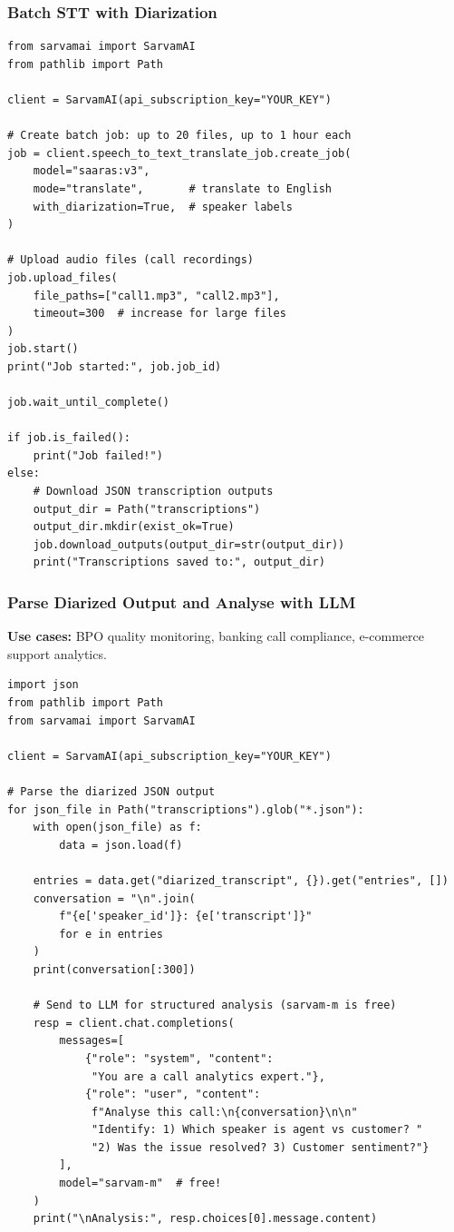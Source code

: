 \begin{frame}[fragile]\frametitle{Batch STT with Diarization}
\begin{lstlisting}
from sarvamai import SarvamAI
from pathlib import Path

client = SarvamAI(api_subscription_key="YOUR_KEY")

# Create batch job: up to 20 files, up to 1 hour each
job = client.speech_to_text_translate_job.create_job(
    model="saaras:v3",
    mode="translate",       # translate to English
    with_diarization=True,  # speaker labels
)

# Upload audio files (call recordings)
job.upload_files(
    file_paths=["call1.mp3", "call2.mp3"],
    timeout=300  # increase for large files
)
job.start()
print("Job started:", job.job_id)

job.wait_until_complete()

if job.is_failed():
    print("Job failed!")
else:
    # Download JSON transcription outputs
    output_dir = Path("transcriptions")
    output_dir.mkdir(exist_ok=True)
    job.download_outputs(output_dir=str(output_dir))
    print("Transcriptions saved to:", output_dir)
\end{lstlisting}
\end{frame}

\begin{frame}[fragile]\frametitle{Parse Diarized Output and Analyse with LLM}
\textbf{Use cases:} BPO quality monitoring, banking call compliance, e-commerce support analytics.
\begin{lstlisting}
import json
from pathlib import Path
from sarvamai import SarvamAI

client = SarvamAI(api_subscription_key="YOUR_KEY")

# Parse the diarized JSON output
for json_file in Path("transcriptions").glob("*.json"):
    with open(json_file) as f:
        data = json.load(f)

    entries = data.get("diarized_transcript", {}).get("entries", [])
    conversation = "\n".join(
        f"{e['speaker_id']}: {e['transcript']}"
        for e in entries
    )
    print(conversation[:300])

    # Send to LLM for structured analysis (sarvam-m is free)
    resp = client.chat.completions(
        messages=[
            {"role": "system", "content":
             "You are a call analytics expert."},
            {"role": "user", "content":
             f"Analyse this call:\n{conversation}\n\n"
             "Identify: 1) Which speaker is agent vs customer? "
             "2) Was the issue resolved? 3) Customer sentiment?"}
        ],
        model="sarvam-m"  # free!
    )
    print("\nAnalysis:", resp.choices[0].message.content)
\end{lstlisting}
\end{frame}


